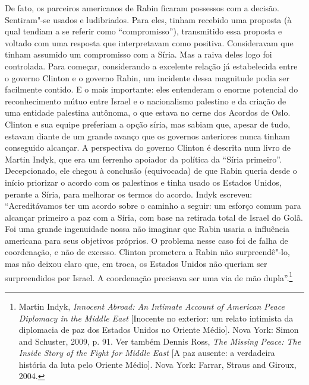 De fato, os parceiros americanos de Rabin ficaram possessos com a
decisão. Sentiram"-se usados e ludibriados. Para eles, tinham recebido
uma proposta (à qual tendiam a se referir como ``compromisso''),
transmitido essa proposta e voltado com uma resposta que interpretavam
como positiva. Consideravam que tinham assumido um compromisso com a
Síria. Mas a raiva deles logo foi controlada. Para começar, considerando
a excelente relação já estabelecida entre o governo Clinton e o governo
Rabin, um incidente dessa magnitude podia ser facilmente contido. E o
mais importante: eles entenderam o enorme potencial do reconhecimento
mútuo entre Israel e o nacionalismo palestino e da criação de uma
entidade palestina autônoma, o que estava no cerne dos Acordos de Oslo.
Clinton e sua equipe preferiam a opção síria, mas sabiam que, apesar de
tudo, estavam diante de um grande avanço que os governos anteriores
nunca tinham conseguido alcançar. A perspectiva do governo Clinton é
descrita num livro de Martin Indyk, que era um ferrenho apoiador da
política da ``Síria primeiro''. Decepcionado, ele chegou à conclusão
(equivocada) de que Rabin queria desde o início priorizar o acordo com
os palestinos e tinha usado os Estados Unidos, perante a Síria, para
melhorar os termos do acordo. Indyk escreveu: ``Acreditávamos ter um
acordo sobre o caminho a seguir: um esforço comum para alcançar primeiro
a paz com a Síria, com base na retirada total de Israel do Golã. Foi uma
grande ingenuidade nossa não imaginar que Rabin usaria a influência
americana para seus objetivos próprios. O problema nesse caso foi de
falha de coordenação, e não de excesso. Clinton prometera a Rabin não
surpreendê"-lo, mas não deixou claro que, em troca, os Estados Unidos não
queriam ser surpreendidos por Israel. A coordenação precisava ser uma
via de mão dupla''.\footnote{Martin Indyk, \textit{Innocent Abroad: An
  Intimate Account of American Peace Diplomacy in the Middle East} 
  {[}Inocente no exterior: um relato intimista da diplomacia de paz
  dos Estados Unidos no Oriente Médio{]}. Nova
  York: Simon and Schuster, 2009, p. 91. Ver também Dennis Ross, \textit{The
  Missing Peace: The Inside Story of the Fight for Middle East} 
  {[}A paz ausente: a verdadeira história da luta pelo Oriente Médio{]}.
  Nova York: Farrar, Straus and Giroux, 2004.}

